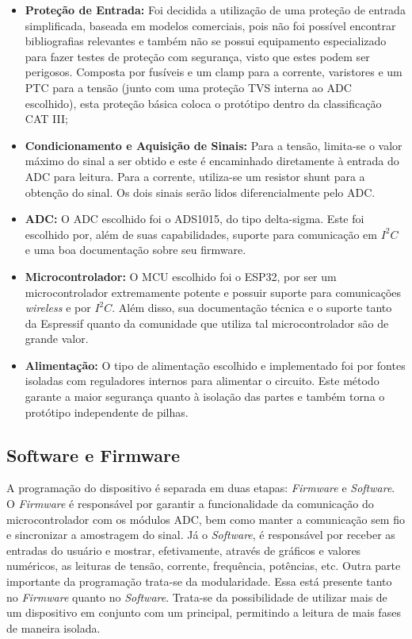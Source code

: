 \begin{itemize}
    \item \textbf{Proteção de Entrada:} Foi decidida a utilização de uma proteção de entrada simplificada, baseada em modelos comerciais, pois não foi possível encontrar bibliografias relevantes e também não se possui equipamento especializado para fazer testes de proteção com segurança, visto que estes podem ser perigosos. Composta por fusíveis e um clamp para a corrente, varistores e um PTC para a tensão (junto com uma proteção TVS interna ao ADC escolhido), esta proteção básica coloca o protótipo dentro da classificação CAT III;
    \item \textbf{Condicionamento e Aquisição de Sinais:} Para a tensão, limita-se o valor máximo do sinal a ser obtido e este é encaminhado diretamente à entrada do ADC para leitura. Para a corrente, utiliza-se um resistor shunt para a obtenção do sinal. Os dois sinais serão lidos diferencialmente pelo ADC.
    \item \textbf{ADC:} O ADC escolhido foi o ADS1015, do tipo delta-sigma. Este foi escolhido por, além de suas capabilidades, suporte para comunicação em $I^2C$ e uma boa documentação sobre seu firmware.
    \item \textbf{Microcontrolador:} O MCU escolhido foi o ESP32, por ser um microcontrolador extremamente potente e possuir suporte para comunicações \textit{wireless} e por $I^2C$. Além disso, sua documentação técnica e o suporte tanto da Espressif quanto da comunidade que utiliza tal microcontrolador são de grande valor.
    \item \textbf{Alimentação:} O tipo de alimentação escolhido e implementado foi por fontes isoladas com reguladores internos para alimentar o circuito. Este método garante a maior segurança quanto à isolação das partes e também torna o protótipo independente de pilhas.
\end{itemize}

\subsection{Software e Firmware}\label{softfirm}

A programação do dispositivo é separada em duas etapas: \textit{Firmware} e \textit{Software}. O \textit{Firmware} é responsável por garantir a funcionalidade da comunicação do microcontrolador com os módulos \gls{ADC}, bem como manter a comunicação sem fio e sincronizar a amostragem do sinal.
Já o \textit{Software}, é responsável por receber as entradas do usuário e mostrar, efetivamente, através de gráficos e valores numéricos, as leituras de tensão, corrente, frequência, potências, etc.
Outra parte importante da programação trata-se da modularidade. Essa está presente tanto no \textit{Firmware} quanto no \textit{Software}. Trata-se da possibilidade de utilizar mais de um dispositivo em conjunto com um principal, permitindo a leitura de mais fases de maneira isolada.

